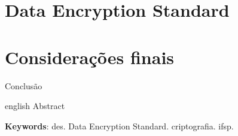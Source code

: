 \documentclass[
	article,			%
	11pt,				%
	oneside,			%
	a4paper,			%
	english,			%
	brazil,				%
	sumario=tradicional
	]{abntex2}
\begin{document}
\section{Data Encryption Standard}





\section*{Considerações finais}

Conclusão


\postextual


\emptythanks
\maketitle

\renewcommand{\resumoname}{Abstract}
\begin{resumoumacoluna}
 \begin{otherlanguage*}{english}
   Abstract

   \vspace{\onelineskip}
 
   \noindent
   \textbf{Keywords}: des. Data Encryption Standard. criptografia. ifsp.
 \end{otherlanguage*}  
\end{resumoumacoluna}


\end{document}
